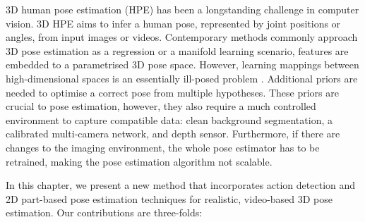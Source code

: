 
3D human pose estimation (HPE) has been a longstanding challenge in computer vision.
3D HPE aims to infer a human pose, represented by joint positions or angles, from input images or videos.  
Contemporary methods commonly approach 3D pose estimation as a regression or a manifold learning scenario, features are embedded to a parametrised 3D pose space. 
However, learning mappings between high-dimensional spaces is an essentially ill-posed problem \cite{Elgammal2004}. Additional priors are needed to optimise a correct pose from multiple hypotheses. 
These priors are crucial to pose estimation, however, they also require a much controlled environment to capture compatible data: clean background segmentation, a calibrated multi-camera network, and depth sensor. 
Furthermore, if there are changes to the imaging environment, the whole pose estimator has to be retrained, making the pose estimation algorithm not scalable. 


In this chapter, we present a new method that incorporates action detection and 2D part-based pose estimation techniques for realistic, video-based 3D pose estimation. Our contributions are three-folds: 
